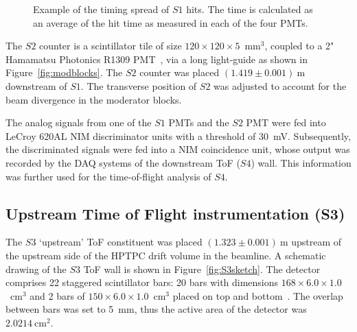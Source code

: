 \begin{figure}
  \begin{adjustbox}{width=0.7\linewidth, center}
    
  \end{adjustbox}
  \caption{Example of the timing spread of $\mathit{S1}$ hits. The time is calculated as an average of the hit time as measured in each of the four PMTs.}
  \label{fig:s1Res}
\end{figure}

The $\mathit{S2}$ counter is a scintillator tile of size $120\times120\times5$~mm$^3$, coupled to a 2" Hamamatsu Photonics R1309 PMT~\cite{Hamamatsu}, via a long light-guide as shown in Figure~\ref{fig:modblocks}.
The $\mathit{S2}$ counter was placed $(1.419 \pm 0.001)~\text{m}$ downstream of $\mathit{S1}$.
The transverse position of $\mathit{S2}$ was adjusted to account for the beam divergence in the moderator blocks.

The analog signals from one of the $\mathit{S1}$ PMTs and the $\mathit{S2}$ PMT were fed into LeCroy 620AL NIM discriminator units with a threshold of 30~mV.
Subsequently, the discriminated signals were fed into a NIM coincidence unit, whose output was recorded by the DAQ systems of the downstream ToF ($\mathit{S4}$) wall.
This information was further used for the time-of-flight analysis of $\mathit{S4}$.

\subsection{Upstream Time of Flight instrumentation (S3)}
\label{subsec:s3Exp}
The $\mathit{S3}$ `upstream' ToF constituent was placed $(1.323 \pm 0.001)~\text{m}$ upstream of the upstream side of the HPTPC drift volume in the beamline.
A schematic drawing of the $\mathit{S3}$ ToF wall is shown in Figure~\ref{fig:S3sketch}.
The detector comprises 22 staggered scintillator bars:  20 bars with dimensions $168 \times 6.0 \times 1.0$~cm$^3$ and 2 bars of  $150 \times 6.0 \times 1.0$~cm$^3$ placed on top and bottom~\cite{S3-proceedings}.
The overlap between bars was set to 5~mm, thus the active area of the detector was $2.0214~\text{cm}^{2}$.

